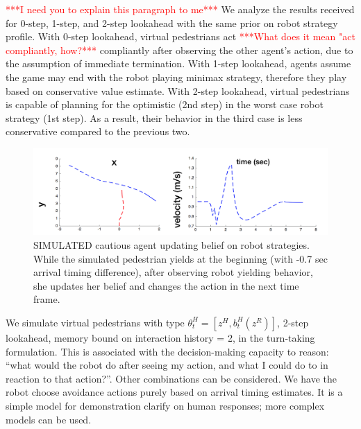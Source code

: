\documentclass[letterpaper, 10 pt, conference]{ieeeconf}  %
\begin{document}
\textcolor{red}{***I need you to explain this paragraph to me***} We analyze the results received for 0-step, 1-step, and 2-step lookahead with the same prior on robot strategy profile. With 0-step lookahead, virtual pedestrians act \textcolor{red}{***What does it mean "act compliantly, how?***} compliantly after observing the other agent's action, due to the assumption of immediate termination. With 1-step lookahead, agents assume the game may end with the robot playing minimax strategy, therefore they play based on conservative value estimate. With 2-step lookahead, virtual pedestrians is capable of planning for the optimistic (2nd step) in the worst case robot strategy (1st step). As a result, their behavior in the third case is less conservative compared to the previous two. 

\begin{figure}[t]
      \centering
      \hspace{-5em}
      \vspace{-1.3em}
      \includegraphics[scale=0.33]{adaptation}
      \hspace{-5em}
      \caption{SIMULATED cautious agent updating belief on robot strategies. While the simulated pedestrian yields at the 
      beginning (with -0.7 sec arrival timing difference), after observing 
      robot yielding behavior, she updates her 
      belief and changes the action in the next time frame.}
      \vspace{-2em}
     \label{fig:adaptation}
\end{figure}

We simulate virtual pedestrians with type $\theta^H_t = [z^H, b^H_t(z^R)]$, 2-step lookahead, memory bound on interaction history = 2, in the turn-taking formulation. This is associated with the decision-making capacity to reason: ``what would the robot do after seeing my action, and what I could do to in reaction to that action?''. Other combinations can be considered. We have the robot choose avoidance actions purely based on arrival timing estimates. It is a simple model for demonstration clarify on human responses; more complex models can be used.
\end{document}
